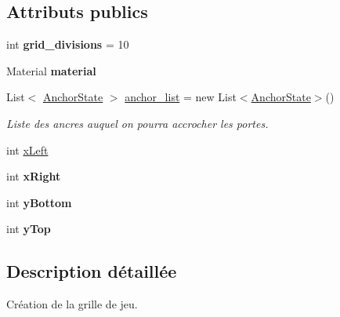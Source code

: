 \subsection*{Attributs publics}
\begin{DoxyCompactItemize}
\item 
\mbox{\label{class_grid_creater_a2e6b4a0cbfd8941b319385ad0b62b2b5}} 
int {\bfseries grid\+\_\+divisions} = 10
\item 
\mbox{\label{class_grid_creater_ade7062c5dca408381c99fd7ffe97428c}} 
Material {\bfseries material}
\item 
\mbox{\label{class_grid_creater_ae889352fee8745fdea823238abc580c6}} 
List$<$ \mbox{\hyperlink{class_anchor_state}{Anchor\+State}} $>$ \mbox{\hyperlink{class_grid_creater_ae889352fee8745fdea823238abc580c6}{anchor\+\_\+list}} = new List$<$\mbox{\hyperlink{class_anchor_state}{Anchor\+State}}$>$()
\begin{DoxyCompactList}\small\item\em Liste des ancres auquel on pourra accrocher les portes. \end{DoxyCompactList}\end{DoxyCompactItemize}
\textbf{ }\par
\begin{DoxyCompactItemize}
\item 
int \mbox{\hyperlink{class_grid_creater_a1b96eaac4e4622871415c70ee7933ee9}{x\+Left}}
\item 
\mbox{\label{class_grid_creater_acd450558c47b141e6ca647c577afc01b}} 
int {\bfseries x\+Right}
\item 
\mbox{\label{class_grid_creater_ab6ccca1c9c4ac6afaa5e294f0795ef55}} 
int {\bfseries y\+Bottom}
\item 
\mbox{\label{class_grid_creater_a982daa5a2b4ee0afff04ca99328a30f2}} 
int {\bfseries y\+Top}
\end{DoxyCompactItemize}



\subsection{Description détaillée}
Création de la grille de jeu. 

